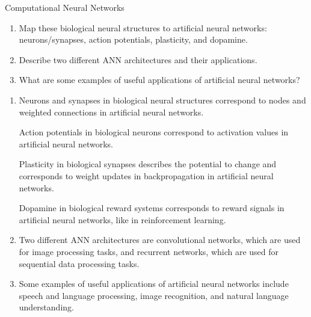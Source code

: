\documentclass{article}
\begin{document}
\begin{exercise}{Computational Neural Networks}
  \begin{enumerate}
    \item Map these biological neural structures to artificial neural networks: neurons/synapses, action potentials, plasticity, and dopamine.
    \item Describe two different ANN architectures and their applications.
    \item What are some examples of useful applications of artificial neural networks?
  \end{enumerate}

  \begin{solution}
    \begin{enumerate}
      \item Neurons and synapses in biological neural structures correspond to nodes and weighted connections in artificial neural networks.
            \par Action potentials in biological neurons correspond to activation values in artificial neural networks.
            \par Plasticity in biological synapses describes the potential to change and corresponds to weight updates in backpropagation in artificial neural networks.
            \par Dopamine in biological reward systems corresponds to reward signals in artificial neural networks, like in reinforcement learning.
      \item Two different ANN architectures are convolutional networks, which are used for image processing tasks, and recurrent networks, which are used for sequential data processing tasks.
      \item Some examples of useful applications of artificial neural networks include speech and language processing, image recognition, and natural language understanding.
    \end{enumerate}
  \end{solution}
\end{exercise}
\end{document}
